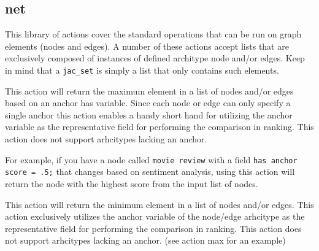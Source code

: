 \subsection{net}
\par
This library of actions cover the standard operations that can be
run on graph elements (nodes and edges). A number of these actions
accept lists that are exclusively composed of instances of defined
architype node and/or edges. Keep in mind that a \lstinline{jac_set}
is simply a list that only contains such elements.
{This action will return the maximum element in a list of nodes
and/or edges based on an anchor has variable. Since each node or edge can only
specify a single anchor this action enables a handy short hand for utilizing the
anchor variable as the representative field for performing the  comparison in
ranking. This action does not support arhcitypes lacking an anchor.
\par
For example, if you have a node called \lstinline{movie review} with a
field \lstinline{has anchor score = .5;} that changes based on sentiment
analysis, using this action will return the node with the highest score from the
input list of nodes.\vspace{4mm}\par
{}\vspace{4mm}\par
{}}
{This action will return the minimum element in a list of nodes
and/or edges. This action exclusively utilizes the anchor variable
of the node/edge arhcitype as the representative field for
performing the comparison in ranking. This action does not support
arhcitypes lacking an anchor. (see action max for an example)\vspace{4mm}\par
{}\vspace{4mm}\par
{}}
